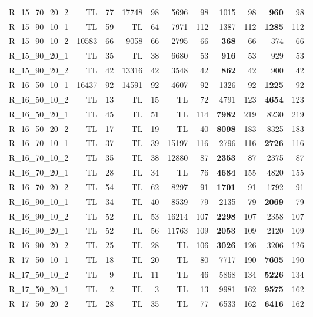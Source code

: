 \documentclass{article}
\begin{document}
\begin{longtable}{lrrrrrrrrrr}
R\_15\_70\_20\_2 & TL & 77 & 17748 & 98 & 5696 & 98 & 1015 & 98 & \textbf{960} & 98 \\
R\_15\_90\_10\_1 & TL & 59 & TL & 64 & 7971 & 112 & 1387 & 112 & \textbf{1285} & 112 \\
R\_15\_90\_10\_2 & 10583 & 66 & 9058 & 66 & 2795 & 66 & \textbf{368} & 66 & 374 & 66 \\
R\_15\_90\_20\_1 & TL & 35 & TL & 38 & 6680 & 53 & \textbf{916} & 53 & 929 & 53 \\
R\_15\_90\_20\_2 & TL & 42 & 13316 & 42 & 3548 & 42 & \textbf{862} & 42 & 900 & 42 \\
R\_16\_50\_10\_1 & 16437 & 92 & 14591 & 92 & 4607 & 92 & 1326 & 92 & \textbf{1225} & 92 \\
R\_16\_50\_10\_2 & TL & 13 & TL & 15 & TL & 72 & 4791 & 123 & \textbf{4654} & 123 \\
R\_16\_50\_20\_1 & TL & 45 & TL & 51 & TL & 114 & \textbf{7982} & 219 & 8230 & 219 \\
R\_16\_50\_20\_2 & TL & 17 & TL & 19 & TL & 40 & \textbf{8098} & 183 & 8325 & 183 \\
R\_16\_70\_10\_1 & TL & 37 & TL & 39 & 15197 & 116 & 2796 & 116 & \textbf{2726} & 116 \\
R\_16\_70\_10\_2 & TL & 35 & TL & 38 & 12880 & 87 & \textbf{2353} & 87 & 2375 & 87 \\
R\_16\_70\_20\_1 & TL & 28 & TL & 34 & TL & 76 & \textbf{4684} & 155 & 4820 & 155 \\
R\_16\_70\_20\_2 & TL & 54 & TL & 62 & 8297 & 91 & \textbf{1701} & 91 & 1792 & 91 \\
R\_16\_90\_10\_1 & TL & 34 & TL & 40 & 8539 & 79 & 2135 & 79 & \textbf{2069} & 79 \\
R\_16\_90\_10\_2 & TL & 52 & TL & 53 & 16214 & 107 & \textbf{2298} & 107 & 2358 & 107 \\
R\_16\_90\_20\_1 & TL & 52 & TL & 56 & 11763 & 109 & \textbf{2053} & 109 & 2120 & 109 \\
R\_16\_90\_20\_2 & TL & 25 & TL & 28 & TL & 106 & \textbf{3026} & 126 & 3206 & 126 \\
R\_17\_50\_10\_1 & TL & 18 & TL & 20 & TL & 80 & 7717 & 190 & \textbf{7605} & 190 \\
R\_17\_50\_10\_2 & TL & 9 & TL & 11 & TL & 46 & 5868 & 134 & \textbf{5226} & 134 \\
R\_17\_50\_20\_1 & TL & 2 & TL & 3 & TL & 13 & 9981 & 162 & \textbf{9575} & 162 \\
R\_17\_50\_20\_2 & TL & 28 & TL & 35 & TL & 77 & 6533 & 162 & \textbf{6416} & 162 \\

\end{longtable}
\end{document}
